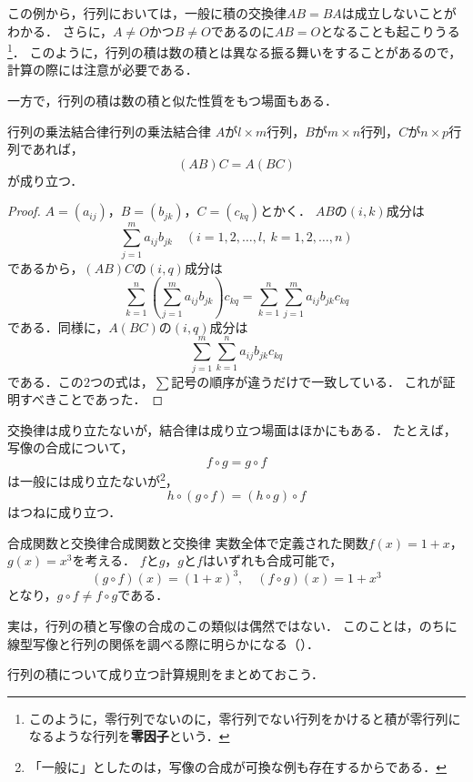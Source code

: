 この例から，行列においては，一般に積の交換律$AB = BA$は成立しないことがわかる．
さらに，$A \ne O$かつ$B \ne O$であるのに$AB = O$となることも起こりうる\footnote{このように，零行列でないのに，零行列でない行列をかけると積が零行列になるような行列を\textbf{零因子}という．}．
このように，行列の積は数の積とは異なる振る舞いをすることがあるので，計算の際には注意が必要である．

一方で，行列の積は数の積と似た性質をもつ場面もある．

\begin{prop}{行列の乗法結合律}{行列の乗法結合律}
  $A$が$l \times m$行列，$B$が$m \times n$行列，$C$が$n \times p$行列であれば，
  \[
    (AB)C = A(BC)
  \]
  が成り立つ．
\end{prop}

\begin{tleftbar}
\begin{proof}
  $A = (a_{ij})$，$B = (b_{jk})$，$C = (c_{kq})$とかく．
  $AB$の$(i, k)$成分は
  \[
    \sum_{j=1}^{m} a_{ij} b_{jk}
    \quad (i = 1, 2, \dots, l,~ k = 1, 2, \dots, n)
  \]
  であるから，$(AB)C$の$(i, q)$成分は
  \[
    \sum_{k=1}^{n} \left( \sum_{j=1}^{m} a_{ij} b_{jk} \right) c_{kq}
    = \sum_{k=1}^{n} \sum_{j=1}^{m} a_{ij} b_{jk} c_{kq}
  \]
  である．同様に，$A(BC)$の$(i, q)$成分は
  \[
    \sum_{j=1}^{m} \sum_{k=1}^{n} a_{ij} b_{jk} c_{kq}
  \]
  である．この$2$つの式は，$\sum$記号の順序が違うだけで一致している．
  これが証明すべきことであった．
\end{proof}
\end{tleftbar}

交換律は成り立たないが，結合律は成り立つ場面はほかにもある．
たとえば，写像の合成について，
\[
  f \circ g = g \circ f
\]
は一般には成り立たないが\footnote{「一般に」としたのは，写像の合成が可換な例も存在するからである．}，
\[
  h \circ (g \circ f) = (h \circ g) \circ f
\]
はつねに成り立つ．

\begin{example}{合成関数と交換律}{合成関数と交換律}
  実数全体で定義された関数$f(x) = 1 + x$，$g(x) = x^3$を考える．
  $f$と$g$，$g$と$f$はいずれも合成可能で，
  \[
    (g \circ f)(x) = (1 + x)^3, \quad (f \circ g)(x) = 1 + x^3
  \]
  となり，$g \circ f \ne f \circ g$である．
\end{example}

実は，行列の積と写像の合成のこの類似は偶然ではない．
このことは，のちに線型写像と行列の関係を調べる際に明らかになる（）．

行列の積について成り立つ計算規則をまとめておこう．

